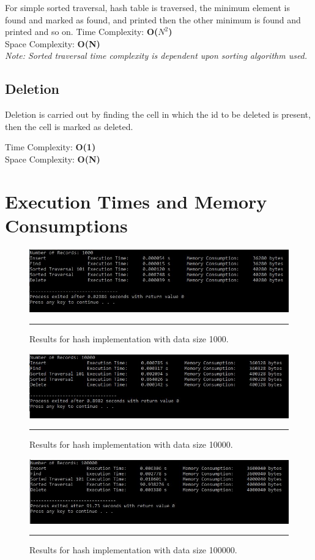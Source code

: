 For simple sorted traversal, hash table is traversed, the minimum element is found and marked as found, and printed then the other minimum is found and printed and so on.
 Time Complexity: \textbf{O($N^2$)}\\ 
 Space Complexity: \textbf{O(N)} \\ 
\textit{Note: Sorted traversal time complexity is dependent upon sorting algorithm used.}\\
\subsection{Deletion}
Deletion is carried out by finding the cell in which the id to be deleted is present, then the cell is marked as deleted. 

Time Complexity: \textbf{O(1)} \\
Space Complexity: \textbf{O(N)}


\section{Execution Times and Memory Consumptions}
\begin{figure}[H]
	\centering
	\includegraphics[scale =0.7]{./Figures/hash1000.jpg}
	\rule{35em}{0.5pt}
	\caption{Results for hash implementation with data size 1000.}
	\label{fig:Hash 1000}
\end{figure}

\begin{figure}[H]
	\centering
	\includegraphics[scale =0.7]{./Figures/hash10000.jpg}
	\rule{35em}{0.5pt}
	\caption{Results for hash implementation with data size 10000.}
	\label{fig:Hash 10000}
\end{figure}

\begin{figure}[H]
	\centering
	\includegraphics[scale =0.7]{./Figures/hash100000.jpg}
	\rule{35em}{0.5pt}
	\caption{Results for hash implementation with data size 100000.}
	\label{fig:Hash 100000}
\end{figure}


